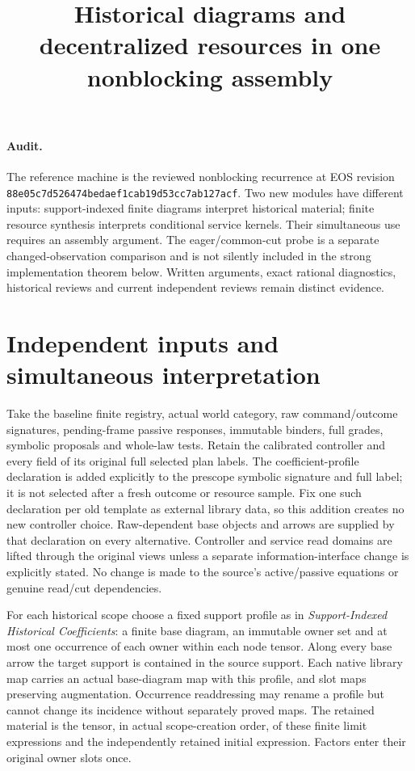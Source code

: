 \documentclass{article}
\title{Historical diagrams and decentralized resources in one nonblocking assembly}
\author{}\date{}
\begin{document}
\maketitle
\paragraph{Audit.}
The reference machine is the reviewed nonblocking recurrence at EOS revision \texttt{88e05c7d526474bedaef1cab19d53cc7ab127acf}. Two new modules have different inputs: support-indexed finite diagrams interpret historical material; finite resource synthesis interprets conditional service kernels. Their simultaneous use requires an assembly argument. The eager/common-cut probe is a separate changed-observation comparison and is not silently included in the strong implementation theorem below. Written arguments, exact rational diagnostics, historical reviews and current independent reviews remain distinct evidence.

\section{Independent inputs and simultaneous interpretation}
Take the baseline finite registry, actual world category, raw command/outcome signatures, pending-frame passive responses, immutable binders, full grades, symbolic proposals and whole-law tests. Retain the calibrated controller and every field of its original full selected plan labels. The coefficient-profile declaration is added explicitly to the prescope symbolic signature and full label; it is not selected after a fresh outcome or resource sample. Fix one such declaration per old template as external library data, so this addition creates no new controller choice. Raw-dependent base objects and arrows are supplied by that declaration on every alternative. Controller and service read domains are lifted through the original views unless a separate information-interface change is explicitly stated. No change is made to the source's active/passive equations or genuine read/cut dependencies.

For each historical scope choose a fixed support profile as in \emph{Support-Indexed Historical Coefficients}: a finite base diagram, an immutable owner set and at most one occurrence of each owner within each node tensor. Along every base arrow the target support is contained in the source support. Each native library map carries an actual base-diagram map with this profile, and slot maps preserving augmentation. Occurrence readdressing may rename a profile but cannot change its incidence without separately proved maps. The retained material is the tensor, in actual scope-creation order, of these finite limit expressions and the independently retained initial expression. Factors enter their original owner slots once.
\end{document}
